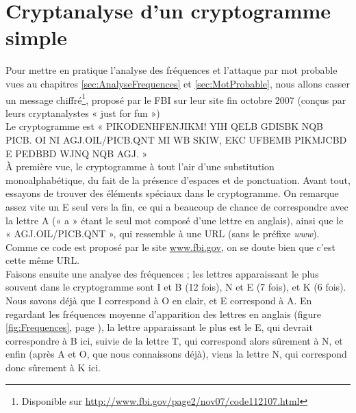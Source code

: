 
\chapter{Cryptanalyse d'un cryptogramme simple\label{Apx:FBI}}
Pour mettre en pratique l'analyse des fréquences et l'attaque par
mot probable vues au chapitres \ref{sec:AnalyseFrequences} et
\ref{sec:MotProbable}, nous allons
casser un message chiffré\footnote{Disponible sur
\url{http://www.fbi.gov/page2/nov07/code112107.html}}, 
proposé par le FBI sur leur site fin
octobre 2007 (conçus par leurs cryptanalystes « just for fun »)
\\
Le cryptogramme est « PIKODENHFENJIKM! YIH QELB GDISBK NQB
PICB. OI NI AGJ.OIL/PICB.QNT MI WB SKIW, EKC UFBEMB PIKMJCBD E
PEDBBD WJNQ NQB AGJ. »
\\

À première vue, le cryptogramme à tout l'air d'une substitution
monoalphabétique, du fait de la présence d'espaces et de
ponctuation.
Avant tout, essayons de trouver des éléments spéciaux dans le
cryptogramme. On remarque assez vite un E seul vers la fin, ce qui
a beaucoup de chance de correspondre avec la lettre A (« a » étant
le seul mot composé d'une lettre en anglais), ainsi que le «
AGJ.OIL/PICB.QNT », qui ressemble à une URL (sans le préfixe
\emph{www}). Comme ce code est proposé par le site
\url{www.fbi.gov}, on se doute bien que c'est cette même URL.
\\

Faisons ensuite une analyse des fréquences ; les lettres
apparaissant le plus souvent dans le cryptogramme sont I et B (12
fois), N et E (7 fois), et K (6 fois).
Nous savons déjà que I correspond à O en clair, et E correspond à
A. En regardant les fréquences moyenne d'apparition des lettres en
anglais (figure \ref{fig:Frequences}, page
\pageref{fig:Frequences}), la lettre apparaissant le plus est le E, qui devrait
correspondre à B ici, suivie de la lettre T, qui correspond alors
sûrement à N, et enfin (après A et O, que nous connaissons déjà),
viens la lettre N, qui correspond donc sûrement à K ici.
\\

